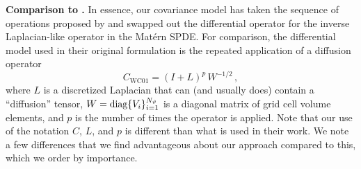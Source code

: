 \noindent\textbf{Comparison to \citet{weaver_correlation_2001}.}
In essence, our covariance model has taken the sequence of operations proposed
by \citet{weaver_correlation_2001} and swapped out the differential operator for
the inverse Laplacian-like operator in the Mat\'ern SPDE.
For comparison, the differential model used in their original formulation is
the repeated application of a diffusion operator
\begin{equation*}
    C_{\text{WC01}} = (I + L)^p \, W^{-1/2} \, ,
\end{equation*}
where $L$ is a discretized Laplacian that can (and usually does) contain a
``diffusion'' tensor, $W = \text{diag}\{V_i\}_{i=1}^{N_{\vartheta}}$ is a diagonal
matrix of grid cell volume
elements, and $p$ is the number of times the operator is applied.
Note that our use of the notation $C$, $L$, and $p$ is different than what
is used in their work.
We note a few differences that we find advantageous about our approach
compared to this, which we order by importance.
